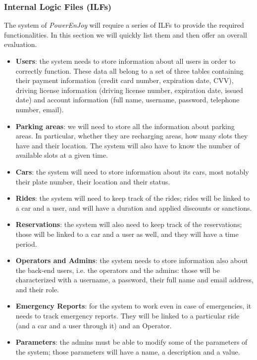 \subsubsection{Internal Logic Files (ILFs)}
The system of \textit{PowerEnJoy} will require a series of ILFs to provide the required functionalities. In this section we will quickly list them and then offer an overall evaluation.

\begin{itemize}
	\item \textbf{Users}: the system needs to store information about all users in order to correctly function. These data all belong to a set of three tables containing their payment information (credit card number, expiration date, CVV), driving license information (driving license number, expiration date, issued date) and account information (full name, username, password, telephone number, email). %
	\item \textbf{Parking areas}: we will need to store all the information about parking areas. In particular, whether they are recharging areas, how many slots they have and their location. The system will also have to know the number of available slots at a given time.
	\item \textbf{Cars}: the system will need to store information about its cars, most notably their plate number, their location and their status.
	\item \textbf{Rides}: the system will need to keep track of the rides; rides will be linked to a car and a user, and will have a duration and applied discounts or sanctions. 
	\item \textbf{Reservations}: the system will also need to keep track of the reservations; those will be linked to a car and a user as well, and they will have a time period. 
	\item \textbf{Operators and Admins}: the system needs to store information also about the back-end users, i.e. the operators and the admins: those will be characterized with a username, a password, their full name and email address, and their role.
	\item \textbf{Emergency Reports}: for the system to work even in case of emergencies, it needs to track emergency reports. They will be linked to a particular ride (and a car and a user through it) and an Operator.
	\item \textbf{Parameters}: the admins must be able to modify some of the parameters of the system; those parameters will have a name, a description and a value.
\end{itemize}

